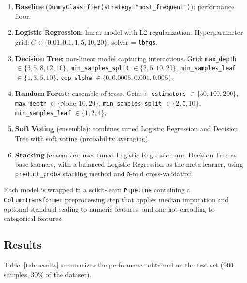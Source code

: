 \documentclass[a4paper,12pt]{article}
\begin{document}
\begin{enumerate}[leftmargin=2cm]
    \item \textbf{Baseline} (\texttt{DummyClassifier(strategy="most\_frequent")}): performance floor.
    \item \textbf{Logistic Regression}: linear model with L2 regularization. Hyperparameter grid: $C \in \{0.01, 0.1, 1, 5, 10, 20\}$, solver = \texttt{lbfgs}.
    \item \textbf{Decision Tree}: non-linear model capturing interactions. Grid: \texttt{max\_depth} $\in \{3,5,8,12,16\}$, \texttt{min\_samples\_split} $\in \{2,5,10,20\}$, \texttt{min\_samples\_leaf} $\in \{1,3,5,10\}$, \texttt{ccp\_alpha} $\in \{0, 0.0005, 0.001, 0.005\}$.
    \item \textbf{Random Forest}: ensemble of trees. Grid: \texttt{n\_estimators} $\in \{50,100,200\}$, \texttt{max\_depth} $\in \{\text{None},10,20\}$, \texttt{min\_samples\_split} $\in \{2,5,10\}$, \texttt{min\_samples\_leaf} $\in \{1,2,4\}$.
    \item \textbf{Soft Voting} (ensemble): combines tuned Logistic Regression and Decision Tree with soft voting (probability averaging).
    \item \textbf{Stacking} (ensemble): uses tuned Logistic Regression and Decision Tree as base learners, with a balanced Logistic Regression as the meta-learner, using \texttt{predict\_proba} stacking method and 5-fold cross-validation.
\end{enumerate}

Each model is wrapped in a scikit-learn \texttt{Pipeline} containing a \texttt{ColumnTransformer} preprocessing step that applies median imputation and optional standard scaling to numeric features, and one-hot encoding to categorical features.

\subsection{Results}

Table~\ref{tab:results} summarizes the performance obtained on the test set (900 samples, 30\% of the dataset).
\end{document}
